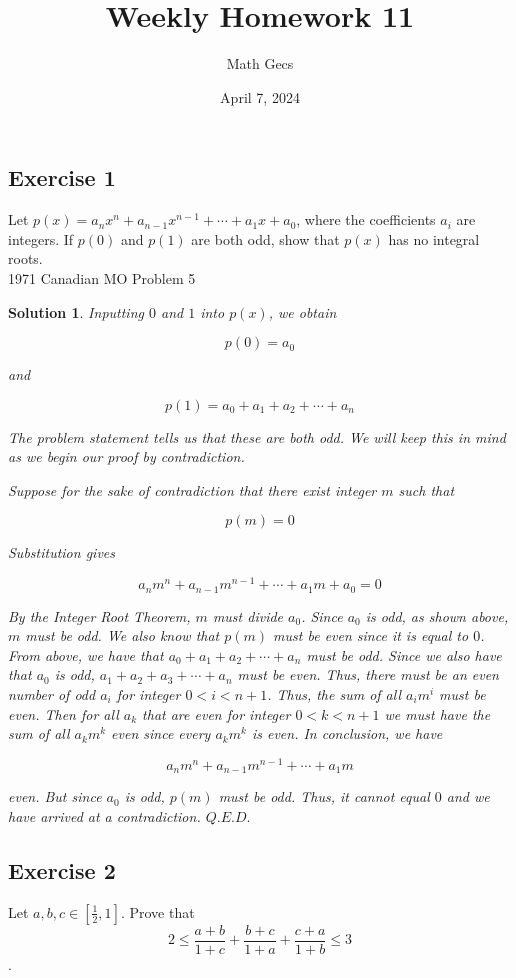 \documentclass[12pt]{article}
\title{Weekly Homework 11}
\author{Math Gecs}
\date{April 7, 2024}
\newtheorem*{solution*}{Solution}
\begin{document}
\maketitle

\subsection*{Exercise 1}
Let $p(x) = a_nx^n + a_{n-1}x^{n-1} + \cdots + a_1x+a_0$, where the coefficients $ a_i$ are integers. If $p(0)$ and $p(1)$ are both odd, show that $p(x)$ has no integral roots.\\

1971 Canadian MO Problem 5


\begin{solution*}
Inputting $0$ and $1$ into $p(x)$, we obtain

$$p(0)=a_0$$

and

$$p(1)=a_0+a_1+a_2+\cdots+a_n$$

The problem statement tells us that these are both odd. We will keep this in mind as we begin our proof by contradiction.

Suppose for the sake of contradiction that there exist integer $m$ such that

$$p(m)=0$$

Substitution gives

$$a_nm^n + a_{n-1}m^{n-1} + \cdots + a_1m+a_0=0$$

By the Integer Root Theorem, $m$ must divide $a_0$. Since $a_0$ is odd, as shown above, $m$ must be odd. We also know that $p(m)$ must be even since it is equal to $0$. From above, we have that $a_0+a_1+a_2+\cdots+a_n$ must be odd. Since we also have that $a_0$ is odd, $a_1+a_2+a_3+\cdots+a_n$ must be even. Thus, there must be an even number of odd $a_i$ for integer $0<i<n+1$. Thus, the sum of all $a_im^i$ must be even. Then for all $a_k$ that are even for integer $0<k<n+1$ we must have the sum of all $a_km^k$ even since every $a_km^k$ is even. In conclusion, we have

$$a_nm^n + a_{n-1}m^{n-1} + \cdots + a_1m$$

even. But since $a_0$ is odd, $p(m)$ must be odd. Thus, it cannot equal $0$ and we have arrived at a contradiction. $Q.E.D.$
\end{solution*}





\subsection*{Exercise 2}
Let $a,b,c \in \left[ \frac 12, 1 \right]$. Prove that 
$$2 \leq \frac{ a+b}{1+c} + \frac{ b+c}{1+a} + \frac{ c+a}{1+b} \leq 3$$.\\
\end{document}
